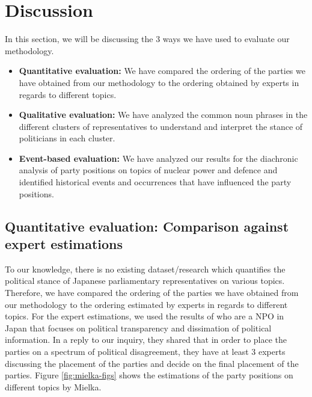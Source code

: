 \documentclass[final,5p,times,twocolumn,authoryear]{elsarticle}
\begin{document}
\clearpage
\twocolumn

\section{Discussion}
In this section, we will be discussing the 3 ways we have used to evaluate our methodology. 
\begin{itemize}
	\item \textbf{Quantitative evaluation:} We have compared the ordering of the parties we have obtained from our methodology to the ordering obtained by experts in regards to different topics. 
	\item \textbf{Qualitative evaluation:} We have analyzed the common noun phrases in the different clusters of representatives to understand and interpret the stance of politicians in each cluster. 
	\item \textbf{Event-based evaluation:} We have analyzed our results for the diachronic analysis of party positions on topics of nuclear power and defence and identified historical events and occurrences that have influenced the party positions.
\end{itemize}

\subsection{Quantitative evaluation: Comparison against expert estimations}
To our knowledge, there is no existing dataset/research which quantifies the political stance of Japanese parliamentary representatives on various topics. Therefore, we have compared the ordering of the parties we have obtained from our methodology to the ordering estimated by experts in regards to different topics. For the expert estimations, we used the results of \citeauthor{Mielka} who are a NPO in Japan that focuses on political transparency and dissimation of political information. In a reply to our inquiry, they shared that in order to place the parties on a spectrum of political disagreement, they have at least 3 experts discussing the placement of the parties and decide on the final placement of the parties. Figure \ref{fig:mielka-figs} shows the estimations of the party positions on different topics by Mielka.
\end{document}

